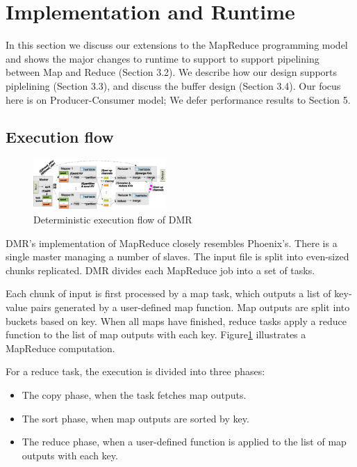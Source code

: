 \section{Implementation and Runtime}
In this section we discuss our extensions to 
the MapReduce programming model and shows the major changes to runtime to 
support \myds
to support pipelining between Map and Reduce (Section 3.2). 
We describe how our design supports
piplelining (Section 3.3), and discuss the buffer design (Section 3.4). 
Our focus here is on Producer-Consumer model; 
We defer performance results to Section 5.



\subsection{Execution flow}
\begin{figure}[!h!t]  
    \centering
    \includegraphics[width=0.45\textwidth]{eps/dmr.eps}
    \caption{Deterministic execution flow of DMR}
    \label{fig:dmr:flow}
\end{figure}

DMR’s implementation of MapReduce closely resembles Phoenix’s. 
There is a single master managing a number of slaves. 
The input file is split into even-sized chunks replicated. 
DMR divides each MapReduce job into a set of tasks. 

Each chunk of input is first processed by a map task, 
which outputs a list of key-value pairs generated 
by a user-defined map function. 
Map outputs are split into buckets based on key. 
When all maps have finished, reduce tasks
apply a reduce function to the list of map outputs with
each key. Figure\ref{fig:dmr:flow} illustrates a MapReduce computation.

For a reduce task, the execution is divided into
three phases:
\begin{itemize}
  \item The copy phase, when the task fetches map outputs.
  \item The sort phase, when map outputs are sorted by key.
  \item The reduce phase, when a user-defined function is
applied to the list of map outputs with each key.
\end{itemize}




